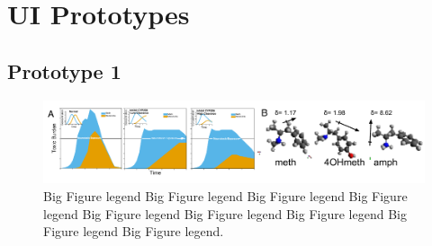 \section{UI Prototypes}\label{UI Prototypes}

\subsection{Prototype 1}

\begin{figure}[h] %
       \centering
       \includegraphics[scale = .80]{Figures/Fig2.pdf}
       \caption{\footnotesize Big Figure legend Big Figure legend Big Figure legend Big Figure legend Big Figure legend Big Figure legend Big Figure legend Big Figure legend Big Figure legend.}
       \label{fig2}
\end{figure}
